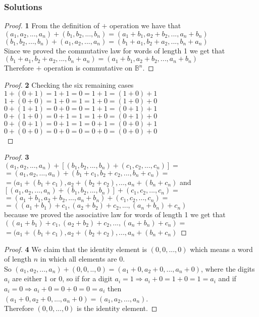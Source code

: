 \documentclass[11pt]{article}
\begin{document}
	\subsubsection*{Solutions}
	\begin{proof}{\textbf{1}} From the definition of $+$ operation we have that\\
		$(a_1, a_2, ..., a_n) + (b_1, b_2, ..., b_n) = (a_1+b_1, a_2+b_2, ..., a_n+b_n)$\\
		$(b_1, b_2, ..., b_n) + (a_1, a_2, ..., a_n) = (b_1+a_1, b_2+a_2, ..., b_n+a_n)$\\
		Since we proved the commutative law for words of length 1 we get that
		$(b_1+a_1, b_2+a_2, ..., b_n+a_n) = (a_1+b_1, a_2+b_2, ..., a_n+b_n)$\\
		Therefore $+$ operation is commutative on $\mathbb{B}^n$.
	\end{proof}		
	\begin{proof}{\textbf{2}} Checking the six remaining cases\\
		$1+(0+1)=1+1=0=1+1=(1+0)+1$\\
		$1+(0+0)=1+0=1=1+0=(1+0)+0$\\
		$0+(1+1)=0+0=0=1+1=(0+1)+1$\\
		$0+(1+0)=0+1=1=1+0=(0+1)+0$\\
		$0+(0+1)=0+1=1=0+1=(0+0)+1$\\
		$0+(0+0)=0+0=0=0+0=(0+0)+0$\\
	\end{proof}
	\begin{proof}{\textbf{3}}\\
		$(a_1,a_2,...,a_n)+[(b_1,b_2,...,b_n)+(c_1,c_2,...,c_n)]=$\\
		$=(a_1,a_2,...,a_n)+(b_1+c_1,b_2+c_2,...,b_n+c_n)=$\\
		$=(a_1+(b_1+c_1),a_2+(b_2+c_2),...,a_n+(b_n+c_n)$ and\\
		$[(a_1,a_2,...,a_n)+(b_1,b_2,...,b_n)]+(c_1,c_2,...,c_n)=$\\
		$=(a_1+b_1,a_2+b_2,...,a_n+b_n)+(c_1,c_2,...,c_n)=$\\
		$=((a_1+b_1)+c_1,(a_2+b_2)+c_2,...,(a_n+b_n)+c_n)$\\
		because we proved the associative law for words of length 1 we get that\\
		$((a_1+b_1)+c_1,(a_2+b_2)+c_2,...,(a_n+b_n)+c_n)=$\\
		$=(a_1+(b_1+c_1),a_2+(b_2+c_2),...,a_n+(b_n+c_n)$
	\end{proof}
	\begin{proof}{\textbf{4}} We claim that the identity element is $(0,0,...,0)$ which means a word of length $n$ in which all elements are $0$.\\
		So $(a_1, a_2, ..., a_n) + (0,0,..,0) = (a_1+0,a_2+0,...,a_n+0)$, where the digits $a_i$ are either $1$ or $0$, so if for a digit $a_i=1 \Rightarrow a_i+0=1+0=1=a_i$ and if $a_i=0 \Rightarrow a_i+0=0+0=0=a_i$ then $(a_1+0,a_2+0,...,a_n+0) = (a_1,a_2,...,a_n)$.\\
	Therefore $(0,0,...,0)$ is the identity element.
	\end{proof}
\end{document}
